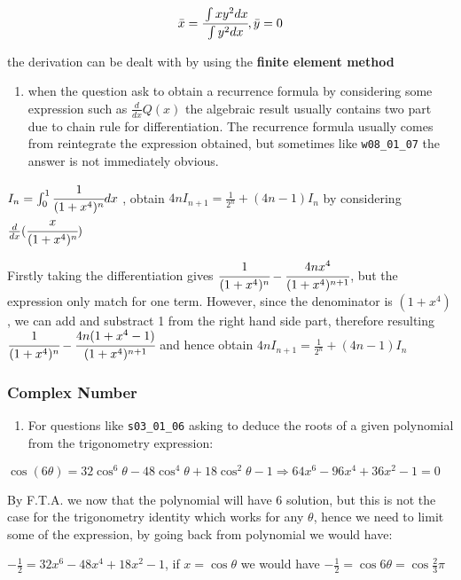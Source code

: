 \documentclass[]{article}
\begin{document}
\[\bar{x} = \cfrac{\int xy^2 dx}{\int y^2 dx}, \bar{y} = 0\]

the derivation can be dealt with by using the \textbf{finite element
method}

\begin{enumerate}
\def\labelenumi{\arabic{enumi}.}
\item
  when the question ask to obtain a recurrence formula by considering
  some expression such as \(\frac{d}{dx} Q(x)\) the algebraic result
  usually contains two part due to chain rule for differentiation. The
  recurrence formula usually comes from reintegrate the expression
  obtained, but sometimes like \texttt{w08\_01\_07} the answer is not
  immediately obvious. 
\end{enumerate}

\(I_n = \int^1_0 \cfrac{1}{(1+x^4)^n} dx\) , obtain
\(4nI_{n+1} = \frac{1}{2^n} +(4n-1)I_n\) by considering
\(\frac{d}{dx} (\cfrac{x}{(1+x^4)^n})\)

Firstly taking the differentiation gives
\(\cfrac{1}{(1+x^4)^n} - \cfrac{4nx^4}{(1+x^4)^{n+1}}\), but the
expression only match for one term. However, since the denominator is
\((1+x^4)\), we can add and substract 1 from the right hand side part,
therefore resulting
\(\cfrac{1}{(1+x^4)^n} - \cfrac{4n(1+x^4-1)}{(1+x^4)^{n+1}}\) and hence
obtain \(4nI_{n+1} = \frac{1}{2^n} +(4n-1)I_n\)

\subsubsection{Complex Number}\label{header-n133}

\begin{enumerate}
\def\labelenumi{\arabic{enumi}.}
\item
  For questions like \texttt{s03\_01\_06} asking to deduce the roots of
  a given polynomial from the trigonometry expression:
\end{enumerate}

\(\cos(6\theta) = 32\cos^6\theta -48\cos^4\theta + 18\cos^2\theta-1 \Rightarrow 64x^6 - 96x^4 + 36x^2 -1 = 0\)

By F.T.A. we now that the polynomial will have 6 solution, but this is
not the case for the trigonometry identity which works for any
\(\theta\), hence we need to limit some of the expression, by going back
from polynomial we would have:

\(-\frac{1}{2} = 32x^6 - 48x^4 + 18x^2 -1\), if \(x  = \cos\theta\) we
would have \(-\frac{1}{2} = \cos 6\theta = \cos\frac{2}{3}\pi\)
\end{document}
